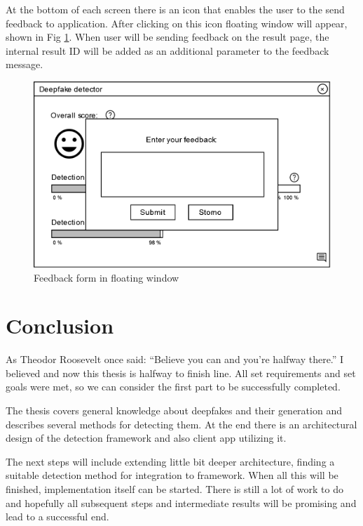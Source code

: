At the bottom of each screen there is an icon that enables the user to the send feedback to application. After clicking on this icon floating window will appear, shown in Fig \ref{fig:client_wireframe_feedback}. When user will be sending feedback on the result page, the internal result ID will be added as an additional parameter to the feedback message. 

\begin{figure}[H]
    \centering
    \includegraphics[width=.475\linewidth]{other-fig/client_wireframe_feedback.png}        
    \caption{Feedback form in floating window}
\label{fig:client_wireframe_feedback}
\end{figure}




\chapter{Conclusion}

As Theodor Roosevelt once said: “Believe you can and you're halfway there.” I believed and now this thesis is halfway to finish line. All set requirements and set goals were met, so we can consider the first part to be successfully completed.

The thesis covers general knowledge about deepfakes and their generation and describes several methods for detecting them. At the end there is an architectural design of the detection framework and also client app utilizing it.

The next steps will include extending little bit deeper architecture, finding a suitable detection method for integration to framework. When all this will be finished, implementation itself can be started. There is still a lot of work to do and hopefully all subsequent steps and intermediate results will be promising and lead to a successful end.
